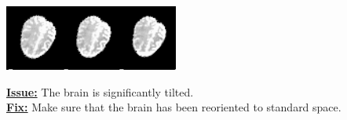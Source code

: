 \documentclass[12pt]{article}
\begin{document}
\noindent\begin{minipage}{0.45\textwidth}
	\includegraphics[scale=0.9]{bad_image3.png}
\end{minipage}%
\hfill%
\begin{minipage}{0.45\textwidth}
	\underline{\textbf{Issue:}} The brain is significantly tilted. \\
	\underline{\textbf{Fix:}} Make sure that the brain has been reoriented to standard space. 
\end{minipage}\newline\newline
\end{document}
